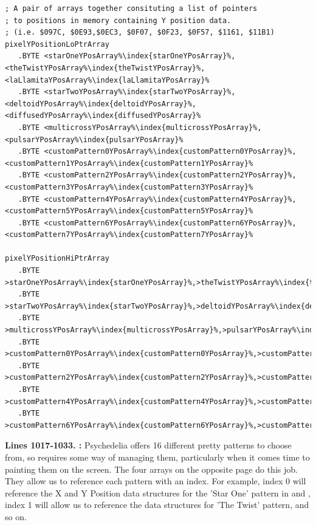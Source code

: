 \begin{lstlisting}[escapechar=\%,caption = All the pattern data structures in Psychedelia organized into a set of arrays.  We use these arrays to choose the correct user-selected pattern at painting time.]
; A pair of arrays together consituting a list of pointers
; to positions in memory containing Y position data.
; (i.e. $097C, $0E93,$0EC3, $0F07, $0F23, $0F57, $1161, $11B1)
pixelYPositionLoPtrArray 
   .BYTE <starOneYPosArray%\index{starOneYPosArray}%,<theTwistYPosArray%\index{theTwistYPosArray}%,<laLlamitaYPosArray%\index{laLlamitaYPosArray}%
   .BYTE <starTwoYPosArray%\index{starTwoYPosArray}%,<deltoidYPosArray%\index{deltoidYPosArray}%,<diffusedYPosArray%\index{diffusedYPosArray}%
   .BYTE <multicrossYPosArray%\index{multicrossYPosArray}%,<pulsarYPosArray%\index{pulsarYPosArray}%
   .BYTE <customPattern0YPosArray%\index{customPattern0YPosArray}%,<customPattern1YPosArray%\index{customPattern1YPosArray}%
   .BYTE <customPattern2YPosArray%\index{customPattern2YPosArray}%,<customPattern3YPosArray%\index{customPattern3YPosArray}%
   .BYTE <customPattern4YPosArray%\index{customPattern4YPosArray}%,<customPattern5YPosArray%\index{customPattern5YPosArray}%
   .BYTE <customPattern6YPosArray%\index{customPattern6YPosArray}%,<customPattern7YPosArray%\index{customPattern7YPosArray}%

pixelYPositionHiPtrArray 
   .BYTE >starOneYPosArray%\index{starOneYPosArray}%,>theTwistYPosArray%\index{theTwistYPosArray}%,>laLlamitaYPosArray%\index{laLlamitaYPosArray}%
   .BYTE >starTwoYPosArray%\index{starTwoYPosArray}%,>deltoidYPosArray%\index{deltoidYPosArray}%,>diffusedYPosArray%\index{diffusedYPosArray}%
   .BYTE >multicrossYPosArray%\index{multicrossYPosArray}%,>pulsarYPosArray%\index{pulsarYPosArray}%
   .BYTE >customPattern0YPosArray%\index{customPattern0YPosArray}%,>customPattern1YPosArray%\index{customPattern1YPosArray}%
   .BYTE >customPattern2YPosArray%\index{customPattern2YPosArray}%,>customPattern3YPosArray%\index{customPattern3YPosArray}%
   .BYTE >customPattern4YPosArray%\index{customPattern4YPosArray}%,>customPattern5YPosArray%\index{customPattern5YPosArray}%
   .BYTE >customPattern6YPosArray%\index{customPattern6YPosArray}%,>customPattern7YPosArray%\index{customPattern7YPosArray}%

\end{lstlisting}
\clearpage

\textbf{Lines 1017-1033. :} Psychedelia
offers 16 different pretty patterns to choose from, so requires some way of managing them, particularly
when it comes time to painting them on the screen. The four arrays on the opposite page do this job.
They allow us to reference each pattern with an index. For example, index 0 will reference the X and
Y Position data structures for the 'Star One' pattern in  and 
, index 1 will allow us to reference the data structures for 'The Twist' pattern,
and so on.


